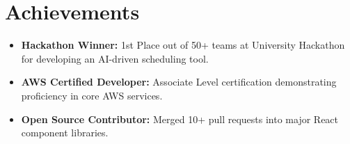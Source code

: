 \documentclass[letterpaper,11pt]{article}
\newcommand{\resumeItem}[1]{
  \item\small{
    {#1 \vspace{-2pt}}
  }
}
\begin{document}
\section{Achievements}
 \begin{itemize}[leftmargin=0.15in]
    \resumeItem{\textbf{Hackathon Winner:} 1st Place out of 50+ teams at University Hackathon for developing an AI-driven scheduling tool.}
    \resumeItem{\textbf{AWS Certified Developer:} Associate Level certification demonstrating proficiency in core AWS services.}
    \resumeItem{\textbf{Open Source Contributor:} Merged 10+ pull requests into major React component libraries.}
 \end{itemize}

\end{document}
